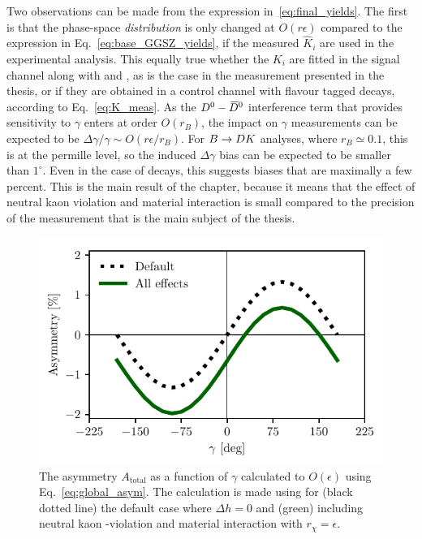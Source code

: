 
Two observations can be made from the expression in~\eqref{eq:final_yields}. The first is that the phase-space \emph{distribution} is only changed at $O(r\epsilon)$ compared to the expression in Eq.~\eqref{eq:base_GGSZ_yields}, if the measured $\hat K_i$ are used in the experimental analysis. This equally true whether the $K_i$ are fitted in the signal channel along with \xpm and \ypm, as is the case in the measurement presented in the thesis, or if they are obtained in a control channel with flavour tagged \D decays, according to Eq.~\eqref{eq:K_meas}. As the ${{D}^0}-{{\kern 0.18em\overline{\kern -0.18em D}}{}^0}$ interference term that provides sensitivity to $\gamma$ enters at order $O(r_B)$, the impact on $\gamma$ measurements can be expected to be $\Delta\gamma/\gamma\sim O(r\epsilon/r_B)$. For ${B}\rightarrow{\ensuremath{D}} K$ analyses, where $r_B\simeq0.1$, this is at the permille level, so the induced $\Delta\gamma$ bias can be expected to be smaller than $1^\circ$. Even in the case of \BtoDpi decays, this suggests biases that are maximally a few percent. This is the main result of the chapter, because it means that the effect of neutral kaon \CP violation and material interaction is small compared to the precision of the measurement that is the main subject of the thesis.

\begin{figure}[tb]
    \centering{}
    \includegraphics{figures/ks_chapter/paper_asym_for_gammas.pdf}
    \caption{The asymmetry $A_\text{total}$ as a function of $\gamma$ calculated to $O(\epsilon)$ using Eq.~\eqref{eq:global_asym}. The calculation is made using for (black dotted line) the default case where $\Delta h = 0$ and (green) including neutral kaon \CP-violation and material interaction with $r_\chi=\epsilon$.}
    \label{fig:global_asym}
\end{figure}

